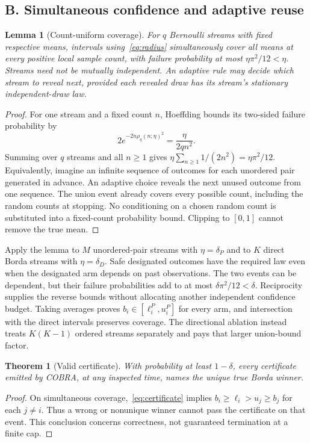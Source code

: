 \documentclass[11pt,a4paper]{article}
\newtheorem{theorem}{Theorem}\newtheorem{lemma}{Lemma}
\begin{document}
\subsection{B. Simultaneous confidence and adaptive reuse}
\begin{lemma}[Count-uniform coverage]\label{lem:coverage}
For $q$ Bernoulli streams with fixed respective means, intervals using~\eqref{eq:radius} simultaneously cover all means at every positive local sample count, with failure probability at most $\eta\pi^2/12<\eta$. Streams need not be mutually independent. An adaptive rule may decide which stream to reveal next, provided each revealed draw has its stream's stationary independent-draw law.
\end{lemma}
\begin{proof}
For one stream and a fixed count $n$, Hoeffding bounds its two-sided failure probability by
\[
2e^{-2n\rho_q(n;\eta)^2}=\frac{\eta}{2qn^2}.
\]
Summing over $q$ streams and all $n\ge1$ gives $\eta\sum_{n\ge1}1/(2n^2)=\eta\pi^2/12$. Equivalently, imagine an infinite sequence of outcomes for each unordered pair generated in advance. An adaptive choice reveals the next unused outcome from one sequence. The union event already covers every possible count, including the random counts at stopping. No conditioning on a chosen random count is substituted into a fixed-count probability bound. Clipping to $[0,1]$ cannot remove the true mean.
\end{proof}
Apply the lemma to $M$ unordered-pair streams with $\eta=\delta_P$ and to $K$ direct Borda streams with $\eta=\delta_D$. Safe designated outcomes have the required law even when the designated arm depends on past observations. The two events can be dependent, but their failure probabilities add to at most $\delta\pi^2/12<\delta$. Reciprocity supplies the reverse bounds without allocating another independent confidence budget. Taking averages proves $b_i\in[\ell_i^P,u_i^P]$ for every arm, and intersection with the direct intervals preserves coverage. The directional ablation instead treats $K(K-1)$ ordered streams separately and pays that larger union-bound factor.

\begin{theorem}[Valid certificate]
With probability at least $1-\delta$, every certificate emitted by COBRA, at any inspected time, names the unique true Borda winner.
\end{theorem}
\begin{proof}
On simultaneous coverage,~\eqref{eq:certificate} implies $b_i\ge\ell_i>u_j\ge b_j$ for each $j\ne i$. Thus a wrong or nonunique winner cannot pass the certificate on that event. This conclusion concerns correctness, not guaranteed termination at a finite cap.
\end{proof}
\end{document}
